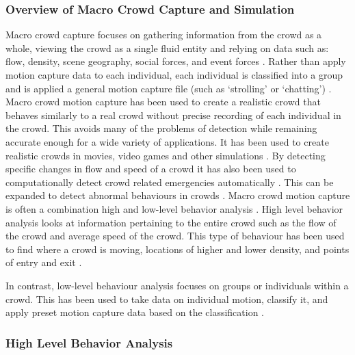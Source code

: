 \documentclass[12pt, onecolumn, conference]{IEEEtran}
\begin{document}
\subsubsection{Overview of Macro Crowd Capture and Simulation}

Macro crowd capture focuses on gathering information from the crowd as a whole, viewing the crowd as a single fluid entity and relying on data such as: flow, density, scene geography, social forces, and event forces \cite{N. Courty}\cite{B. Boghossian}\cite{R. Mehran}\cite{S. Saxena}. Rather than apply motion capture data to each individual, each individual is classified into a group and is applied a general motion capture file (such as ‘strolling’ or ‘chatting’) \cite{K. Lee}. Macro crowd motion capture has been used to create a realistic crowd that behaves similarly to a real crowd without precise recording of each individual in the crowd. This avoids many of the problems of detection while remaining accurate enough for a wide variety of applications. It has been used to create realistic crowds in movies, video games and other simulations \cite{N. Courty}\cite{R. Mehran}. By detecting specific changes in flow and speed of a crowd it has also been used to computationally detect crowd related emergencies automatically \cite{B. Boghossian}. This can be expanded to detect abnormal behaviours in crowds \cite{S. Saxena}.
Macro crowd motion capture is often a combination high and low-level behavior analysis \cite{K. Lee}. High level behavior analysis looks at information pertaining to the entire crowd such as the flow of the crowd and average speed of the crowd. This type of behaviour has been used to find where a crowd is moving, locations of higher and lower density, and points of entry and exit \cite{N. Courty}\cite{B. Boghossian}\cite{R. Mehran}\cite{M. Rodriguez}.

In contrast, low-level behaviour analysis focuses on groups or individuals within a crowd. This has been used to take data on individual motion, classify it, and apply preset motion capture data based on the classification \cite{K. Lee}\cite{S. Saxena}. 

\subsubsection{High Level Behavior Analysis}
\end{document}
